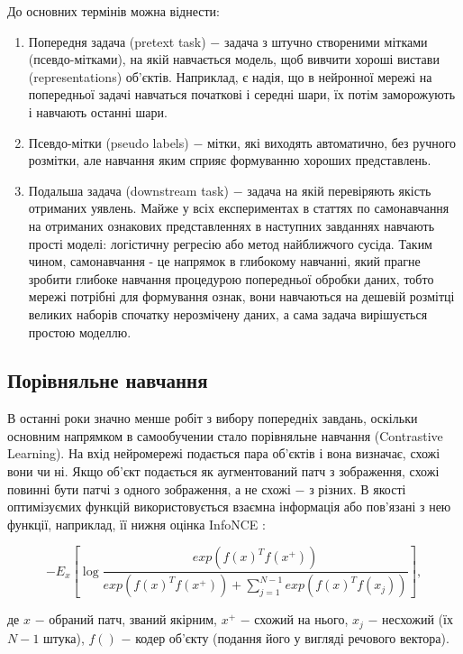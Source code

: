 До основних термінів можна віднести:

\begin{enumerate}
	\item Попередня задача (pretext task) $-$ задача з штучно створеними мітками (псевдо-мітками), на якій навчається модель, щоб вивчити хороші вистави (representations) об'єктів. Наприклад, є надія, що в нейронної мережі на попередньої задачі навчаться початкові і середні шари, їх потім заморожують і навчають останні шари.
	\item Псевдо-мітки (pseudo labels) $-$ мітки, які виходять автоматично, без ручного розмітки, але навчання яким сприяє формуванню хороших представлень.
	\item Подальша задача (downstream task) $-$ задача на якій перевіряють якість отриманих уявлень. Майже у всіх експериментах в статтях по самонавчання на отриманих ознакових представленнях в наступних завданнях навчають прості моделі: логістичну регресію або метод найближчого сусіда. Таким чином, самонавчання - це напрямок в глибокому навчанні, який прагне зробити глибоке навчання процедурою попередньої обробки даних, тобто мережі потрібні для формування ознак, вони навчаються на дешевій розмітці великих наборів спочатку нерозмічену даних, а сама задача вирішується простою моделлю.
\end{enumerate}

\subsection{Порівняльне навчання}

В останні роки значно менше робіт з вибору попередніх завдань, оскільки основним напрямком в самообучении стало порівняльне навчання (Contrastive Learning). На вхід нейромережі подається пара об'єктів і вона визначає, схожі вони чи ні. Якщо об'єкт подається як аугментований патч з зображення, схожі повинні бути патчі з одного зображення, а не схожі $-$ з різних. В якості оптимізуємих функцій використовується взаємна інформація або пов'язані з нею функції, наприклад, її нижня оцінка InfoNCE :

\begin{equation}\label{eq:infonce}
-E_{x}\left[ \log{\frac{exp(f(x)^{T}f(x^{+}))}{exp(f(x)^{T}f(x^{+}))+\sum_{j=1}^{N-1}exp(f(x)^{T}f(x_{j}))}} \right],
\end{equation}

\noindent де $x$ $-$ обраний патч, званий якірним, \newline
\hspace*{15pt} $x^{+}$ $-$ схожий на нього, \newline
\hspace*{15pt} $x_{j}$ $-$ несхожий (їх $N-1$ штука), \newline
\hspace*{15pt} $f()$ $-$ кодер об'єкту (подання його у вигляді речового вектора). 

